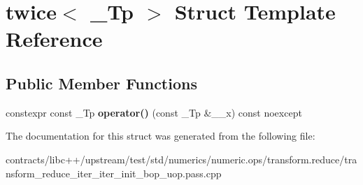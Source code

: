\hypertarget{structtwice}{}\section{twice$<$ \+\_\+\+Tp $>$ Struct Template Reference}
\label{structtwice}
\subsection*{Public Member Functions}
\begin{DoxyCompactItemize}
\item 
\mbox{\label{structtwice_a527f80060cbc8d7f04874777e228e9e5}} 
constexpr const \+\_\+\+Tp {\bfseries operator()} (const \+\_\+\+Tp \&\+\_\+\+\_\+x) const noexcept
\end{DoxyCompactItemize}


The documentation for this struct was generated from the following file\+:\begin{DoxyCompactItemize}
\item 
contracts/libc++/upstream/test/std/numerics/numeric.\+ops/transform.\+reduce/transform\+\_\+reduce\+\_\+iter\+\_\+iter\+\_\+init\+\_\+bop\+\_\+uop.\+pass.\+cpp\end{DoxyCompactItemize}
